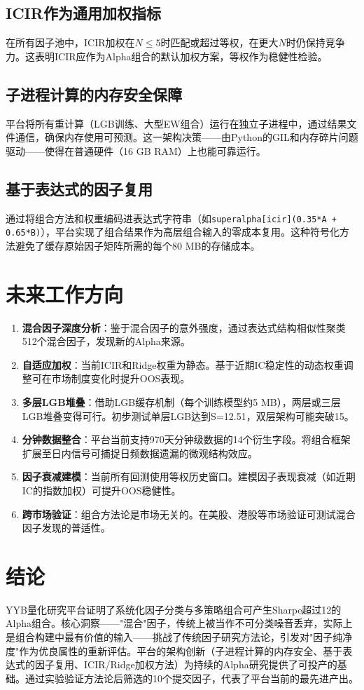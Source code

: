 \documentclass[11pt,a4paper]{ctexart}
\begin{document}
\subsection{ICIR作为通用加权指标}
在所有因子池中，ICIR加权在$N\leq5$时匹配或超过等权，在更大$N$时仍保持竞争力。这表明ICIR应作为Alpha组合的默认加权方案，等权作为稳健性检验。

\subsection{子进程计算的内存安全保障}
平台将所有重计算（LGB训练、大型EW组合）运行在独立子进程中，通过结果文件通信，确保内存使用可预测。这一架构决策——由Python的GIL和内存碎片问题驱动——使得在普通硬件（16 GB RAM）上也能可靠运行。

\subsection{基于表达式的因子复用}
通过将组合方法和权重编码进表达式字符串（如\texttt{superalpha[icir](0.35*A + 0.65*B)}），平台实现了组合结果作为高层组合输入的零成本复用。这种符号化方法避免了缓存原始因子矩阵所需的每个80 MB的存储成本。

\section{未来工作方向}

\begin{enumerate}[nosep]
    \item \textbf{混合因子深度分析}：鉴于混合因子的意外强度，通过表达式结构相似性聚类512个混合因子，发现新的Alpha来源。
    \item \textbf{自适应加权}：当前ICIR和Ridge权重为静态。基于近期IC稳定性的动态权重调整可在市场制度变化时提升OOS表现。
    \item \textbf{多层LGB堆叠}：借助LGB缓存机制（每个训练模型约5 MB），两层或三层LGB堆叠变得可行。初步测试单层LGB达到S=12.51，双层架构可能突破15。
    \item \textbf{分钟数据整合}：平台当前支持970天分钟级数据的14个衍生字段。将组合框架扩展至日内信号可捕捉日频数据遗漏的微观结构效应。
    \item \textbf{因子衰减建模}：当前所有回测使用等权历史窗口。建模因子表现衰减（如近期IC的指数加权）可提升OOS稳健性。
    \item \textbf{跨市场验证}：组合方法论是市场无关的。在美股、港股等市场验证可测试混合因子发现的普适性。
\end{enumerate}

\section{结论}

YYB量化研究平台证明了系统化因子分类与多策略组合可产生Sharpe超过12的Alpha组合。核心洞察——"混合"因子，传统上被当作不可分类噪音丢弃，实际上是组合构建中最有价值的输入——挑战了传统因子研究方法论，引发对"因子纯净度"作为优良属性的重新评估。平台的架构创新（子进程计算的内存安全、基于表达式的因子复用、ICIR/Ridge加权方法）为持续的Alpha研究提供了可投产的基础。通过实验验证方法论后筛选的10个提交因子，代表了平台当前的最先进产出。
\end{document}
